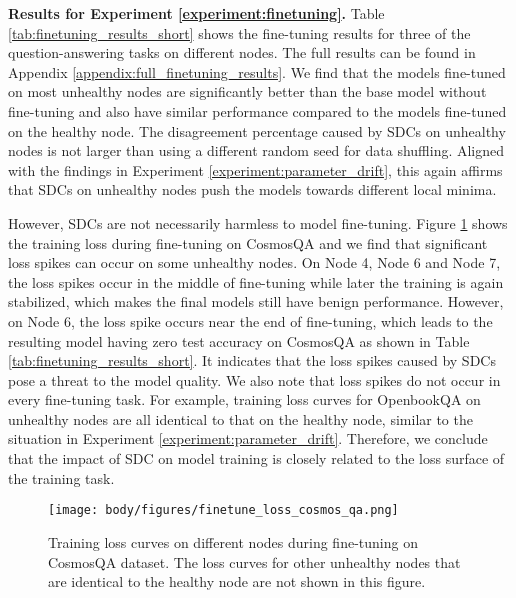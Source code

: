 \textbf{Results for Experiment \ref{experiment:finetuning}.} 
Table \ref{tab:finetuning_results_short} shows the fine-tuning results for three of the question-answering tasks on different nodes. The full results can be found in Appendix \ref{appendix:full_finetuning_results}. We find that the models fine-tuned on most unhealthy nodes are significantly better than the base model without fine-tuning and also have similar performance compared to the models fine-tuned on the healthy node. The disagreement percentage caused by SDCs on unhealthy nodes is not larger than using a different random seed for data shuffling. Aligned with the findings in Experiment \ref{experiment:parameter_drift}, this again affirms that SDCs on unhealthy nodes push the models towards different local minima.

However, SDCs are not necessarily harmless to model fine-tuning. Figure \ref{fig:finetuning_loss_spikes} shows the training loss during fine-tuning on CosmosQA and we find that significant loss spikes can occur on some unhealthy nodes. On Node 4, Node 6 and Node 7, the loss spikes occur in the middle of fine-tuning while later the training is again stabilized, which makes the final models still have benign performance. However, on Node 6, the loss spike occurs near the end of fine-tuning, which leads to the resulting model having zero test accuracy on CosmosQA as shown in Table \ref{tab:finetuning_results_short}. It indicates that the loss spikes caused by SDCs pose a threat to the model quality. We also note that loss spikes do not occur in every fine-tuning task. For example, training loss curves for OpenbookQA on unhealthy nodes are all identical to that on the healthy node, similar to the situation in Experiment \ref{experiment:parameter_drift}. Therefore, we conclude that the impact of SDC on model training is closely related to the loss surface of the training task.

\begin{figure}[t]
    \centering
    \texttt{[image: body/figures/finetune\_loss\_cosmos\_qa.png]}
    \vskip -0.15in
    \caption{Training loss curves on different nodes during fine-tuning on CosmosQA dataset. The loss curves for other unhealthy nodes that are identical to the healthy node are not shown in this figure.}
    \label{fig:finetuning_loss_spikes}
    \vskip -0.2in
\end{figure}





